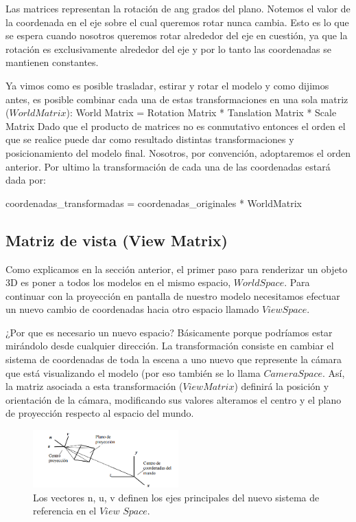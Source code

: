 \documentclass[a4paper]{article}
\begin{document}
Las  matrices representan  la rotación de ang grados del plano. Notemos el valor de la coordenada en el eje sobre el cual queremos rotar nunca cambia. Esto es lo que se espera cuando nosotros queremos rotar alrededor del eje en cuestión, ya que  la rotación es exclusivamente alrededor del eje y por lo tanto las coordenadas se mantienen constantes.

\par Ya vimos como es posible trasladar, estirar y rotar el modelo y como dijimos antes, es posible combinar cada una de estas transformaciones en una sola matriz ($World Matrix$): \newline
World Matrix = Rotation Matrix * Tanslation Matrix * Scale Matrix\newline  \newline
 Dado que el producto de matrices no es conmutativo entonces el orden el que se realice puede dar como resultado distintas transformaciones y posicionamiento del modelo final. Nosotros, por convención, adoptaremos el orden anterior.
Por ultimo la transformación de cada una de las coordenadas estará dada por: \newline

coordenadas\_transformadas = coordenadas\_originales * WorldMatrix 


\subsection{Matriz de vista (View Matrix)}
Como explicamos en la sección anterior, el primer paso para  renderizar un objeto 3D  es poner a todos los modelos en el mismo espacio, $World Space$. Para continuar con la proyección en pantalla de nuestro modelo necesitamos efectuar un nuevo cambio de coordenadas hacia otro espacio llamado $View Space$.

\par ¿Por que es necesario un nuevo espacio? Básicamente porque podríamos estar mirándolo desde cualquier dirección. La transformación consiste en cambiar el sistema de coordenadas de toda la escena a uno nuevo que represente la cámara que está visualizando el modelo (por eso también se lo llama $Camera Space$. Así, la matriz asociada a esta transformación ($View Matrix$) definirá la posición y orientación de la cámara, modificando sus valores alteramos el centro y el plano de proyección respecto al espacio del mundo. 
\begin{figure}[h!]
    \centering
    \includegraphics[width=0.50\textwidth]{Imagenes/a.png}
    \caption{Los vectores n, u, v definen los ejes principales del nuevo sistema de referencia en el $View$ $Space$.}
    \label{fig:mesh1}
\end{figure}
\end{document}
